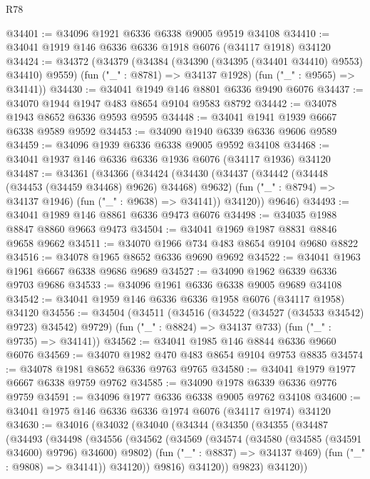 \begin{lexlean}{R78}
\begin{coremodule}
@34401 := @34096 @1921 @6336 @6338 @9005 @9519 @34108
@34410 := @34041 @1919 @146 @6336 @6336 @1918 @6076 (@34117 @1918) @34120
@34424 := @34372
    (@34379
      (@34384 (@34390 (@34395 (@34401 @34410) @9553) @34410) @9559)
      (fun ("_" : @8781) => @34137 @1928)
      (fun ("_" : @9565) => @34141))
@34430 := @34041 @1949 @146 @8801 @6336 @9490 @6076
@34437 := @34070 @1944 @1947 @483 @8654 @9104 @9583 @8792
@34442 := @34078 @1943 @8652 @6336 @9593 @9595
@34448 := @34041 @1941 @1939 @6667 @6338 @9589 @9592
@34453 := @34090 @1940 @6339 @6336 @9606 @9589
@34459 := @34096 @1939 @6336 @6338 @9005 @9592 @34108
@34468 := @34041 @1937 @146 @6336 @6336 @1936 @6076 (@34117 @1936) @34120
@34487 := @34361
    (@34366
      (@34424
        (@34430
          (@34437
            (@34442 (@34448 (@34453 (@34459 @34468) @9626) @34468) @9632)
            (fun ("_" : @8794) => @34137 @1946)
            (fun ("_" : @9638) => @34141))
          @34120))
      @9646)
@34493 := @34041 @1989 @146 @8861 @6336 @9473 @6076
@34498 := @34035 @1988 @8847 @8860 @9663 @9473
@34504 := @34041 @1969 @1987 @8831 @8846 @9658 @9662
@34511 := @34070 @1966 @734 @483 @8654 @9104 @9680 @8822
@34516 := @34078 @1965 @8652 @6336 @9690 @9692
@34522 := @34041 @1963 @1961 @6667 @6338 @9686 @9689
@34527 := @34090 @1962 @6339 @6336 @9703 @9686
@34533 := @34096 @1961 @6336 @6338 @9005 @9689 @34108
@34542 := @34041 @1959 @146 @6336 @6336 @1958 @6076 (@34117 @1958) @34120
@34556 := @34504
    (@34511
      (@34516 (@34522 (@34527 (@34533 @34542) @9723) @34542) @9729)
      (fun ("_" : @8824) => @34137 @733)
      (fun ("_" : @9735) => @34141))
@34562 := @34041 @1985 @146 @8844 @6336 @9660 @6076
@34569 := @34070 @1982 @470 @483 @8654 @9104 @9753 @8835
@34574 := @34078 @1981 @8652 @6336 @9763 @9765
@34580 := @34041 @1979 @1977 @6667 @6338 @9759 @9762
@34585 := @34090 @1978 @6339 @6336 @9776 @9759
@34591 := @34096 @1977 @6336 @6338 @9005 @9762 @34108
@34600 := @34041 @1975 @146 @6336 @6336 @1974 @6076 (@34117 @1974) @34120
@34630 := @34016
    (@34032
      (@34040
        (@34344
          (@34350
            (@34355
              (@34487
                (@34493
                  (@34498
                    (@34556
                      (@34562
                        (@34569
                          (@34574 (@34580 (@34585 (@34591 @34600) @9796) @34600) @9802)
                          (fun ("_" : @8837) => @34137 @469)
                          (fun ("_" : @9808) => @34141))
                        @34120))
                    @9816)
                  @34120))
              @9823)
            @34120))

\end{coremodule}
\end{lexlean}
